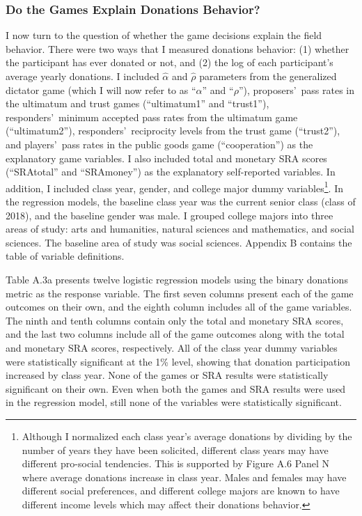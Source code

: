 \documentclass[12pt]{article}
\begin{document}
\subsubsection{Do the Games Explain Donations Behavior?}
I now turn to the question of whether the game decisions explain the field behavior. There were two ways that I measured donations behavior: (1) whether the participant has ever donated or not, and (2) the log of each participant\rq s average yearly donations. I included \(\hat{\alpha}\) and \(\hat{\rho}\) parameters from the generalized dictator game (which I will now refer to as ``\(\alpha\)'' and ``\(\rho\)''), proposers\rq \ pass rates in the ultimatum and trust games (``ultimatum1'' and ``trust1''), responders\rq \ minimum accepted pass rates from the ultimatum game (``ultimatum2''), responders\rq \ reciprocity levels from the trust game (``trust2''), and players\rq \ pass rates in the public goods game (``cooperation'') as the explanatory game variables. I also included total and monetary SRA scores (``SRAtotal'' and ``SRAmoney'') as the explanatory self-reported variables. In addition, I included class year, gender, and college major dummy variables\footnote{Although I normalized each class year\rq s average donations by dividing by the number of years they have been solicited, different class years may have different pro-social tendencies. This is supported by Figure A.6 Panel N where average donations increase in class year. Males and females may have different social preferences, and different college majors are known to have different income levels which may affect their donations behavior.}. In the regression models, the baseline class year was the current senior class (class of 2018), and the baseline gender was male. I grouped college majors into three areas of study: arts and humanities, natural sciences and mathematics, and social sciences. The baseline area of study was social sciences. Appendix B contains the table of variable definitions. 

Table A.3a presents twelve logistic regression models using the binary donations metric as the response variable. The first seven columns present each of the game outcomes on their own, and the eighth column includes all of the game variables. The ninth and tenth columns contain only the total and monetary SRA scores, and the last two columns include all of the game outcomes along with the total and monetary SRA scores, respectively. All of the class year dummy variables were statistically significant at the 1\% level, showing that donation participation increased by class year. None of the games or SRA results were statistically significant on their own. Even when both the games and SRA results were used in the regression model, still none of the variables were statistically significant. 
\end{document}
